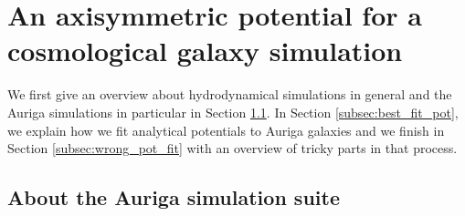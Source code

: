 \section{An axisymmetric potential for a cosmological galaxy simulation}\label{sec:Auriga}
We first give an overview about hydrodynamical simulations in general and the Auriga simulations in particular in Section \ref{subsec:auriga}. In Section \ref{subsec:best_fit_pot}, we explain how we fit analytical potentials to Auriga galaxies and we finish in Section \ref{subsec:wrong_pot_fit} with an overview of tricky parts in that process.

\subsection{About the Auriga simulation suite}\label{subsec:auriga}
